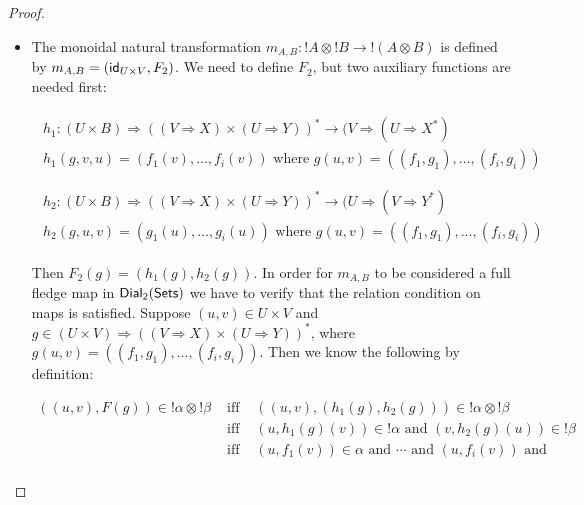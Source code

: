 \begin{proof}
\begin{center}
\begin{itemize}
    \item The monoidal natural transformation
      $m_{A,B} : !A \otimes !B \to !(A \otimes B)$ is defined by
      $m_{A,B} = (\mathsf{id}_{U \times V},F_2)$. We need to define $F_2$,
      but two auxiliary functions are needed first:
      \begin{center}
        \begin{math}
          \begin{array}{lll}
            \begin{array}{lll}
              h_1 : (U \times B) \Rightarrow ((V \Rightarrow X) \times (U \Rightarrow Y))^* \to 
                    (V \Rightarrow (U \Rightarrow X^*)\\
              h_1(g,v,u) = (f_1(v),\ldots,f_i(v))
              \text{ where } g(u,v) = ((f_1,g_1),\ldots,(f_i,g_i))
            \end{array}
            \\
            &  \\
            \begin{array}{lll}
              h_2 : (U \times B) \Rightarrow ((V \Rightarrow X) \times (U \Rightarrow Y))^* \to 
                    (U \Rightarrow (V \Rightarrow Y^*)\\
              h_2(g,u,v) = (g_1(u),\ldots,g_i(u))
              \text{ where } g(u,v) = ((f_1,g_1),\ldots,(f_i,g_i))
            \end{array}
          \end{array}
        \end{math}
      \end{center}
      Then $F_2(g) = (h_1(g),h_2(g))$.  In order for $m_{A,B}$ to be
      considered a full fledge map in $\mathsf{Dial_2}(\mathsf{Sets})$ we have to verify that
      the relation condition on maps is satisfied.  Suppose $(u,v) \in U \times V$ and 
      $g \in (U \times V) \Rightarrow ((V \Rightarrow X) \times (U \Rightarrow Y))^*$, 
      where $g(u,v) = ((f_1,g_1), \ldots,(f_i,g_i))$. Then we know the following by definition:
      \begin{center}
        \begin{math}
          \begin{array}{lll}
            ((u,v),F(g)) \in !\alpha \otimes !\beta 
            & \text{ iff } & ((u,v),(h_1(g),h_2(g))) \in !\alpha \otimes !\beta\\
            & \text{ iff } & (u,h_1(g)(v)) \in !\alpha \text{ and } (v,h_2(g)(u)) \in !\beta\\
            & \text{ iff } & (u,f_1(v)) \in \alpha \text{ and } \cdots \text{ and } (u,f_i(v)) \text{ and }\\

\end{array}
\end{math}
\end{center}
\end{itemize}
\end{center}
\end{proof}

